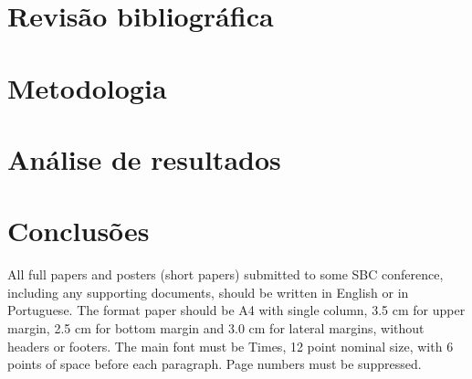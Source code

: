 \documentclass[12pt]{article}
\begin{document}

\section{Revisão bibliográfica} %


\section{Metodologia} %



\section{Análise de resultados}


\section{Conclusões}




All full papers and posters (short papers) submitted to some SBC conference,
including any supporting documents, should be written in English or in
Portuguese. The format paper should be A4 with single column, 3.5 cm for upper
margin, 2.5 cm for bottom margin and 3.0 cm for lateral margins, without
headers or footers. The main font must be Times, 12 point nominal size, with 6
points of space before each paragraph. Page numbers must be suppressed.
\end{document}
